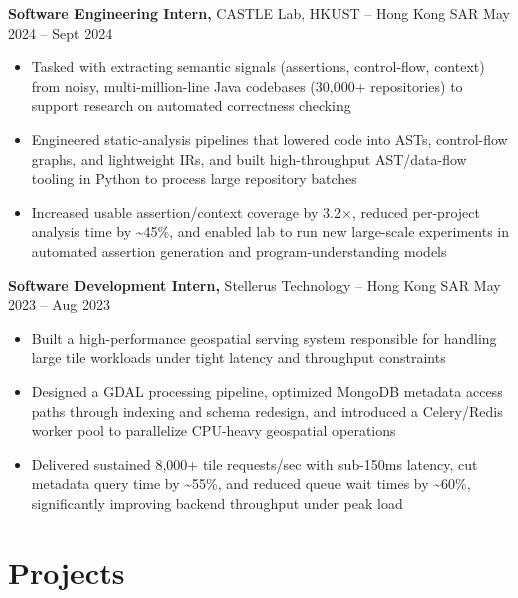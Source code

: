 \documentclass[11pt]{article}
\begin{document}
        
\textbf{Software Engineering Intern,} {\small CASTLE Lab, HKUST} -- Hong Kong SAR \hfill May 2024 -- Sept 2024 \\
\vspace{-9pt}
\begin{itemize}
    \item Tasked with extracting semantic signals (assertions, control-flow, context) from noisy, multi-million-line Java codebases (30,000+ repositories) to support research on automated correctness checking
    \item Engineered static-analysis pipelines that lowered code into ASTs, control-flow graphs, and lightweight IRs, and built high-throughput AST/data-flow tooling in Python to process large repository batches
    \item Increased usable assertion/context coverage by 3.2$\times$, reduced per-project analysis time by \textasciitilde45\%, and enabled lab to run new large-scale experiments in automated assertion generation and program-understanding models
\end{itemize}

        \vspace{-5pt}
    
        
\textbf{Software Development Intern,} {\small Stellerus Technology} -- Hong Kong SAR \hfill May 2023 -- Aug 2023 \\
\vspace{-9pt}
\begin{itemize}
    \item Built a high-performance geospatial serving system responsible for handling large tile workloads under tight latency and throughput constraints
    \item Designed a GDAL processing pipeline, optimized MongoDB metadata access paths through indexing and schema redesign, and introduced a Celery/Redis worker pool to parallelize CPU-heavy geospatial operations
    \item Delivered sustained 8,000+ tile requests/sec with sub-150ms latency, cut metadata query time by \textasciitilde55\%, and reduced queue wait times by \textasciitilde60\%, significantly improving backend throughput under peak load
\end{itemize}

        \vspace{-5pt}
    
    \vspace{-18pt}

    \section*{ Projects }
    
\end{document}

